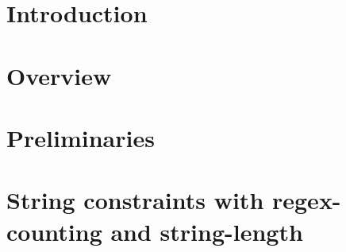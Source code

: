 \documentclass[preprint,12pt]{elsarticle}
\newcommand{\zhilin}[1]{\color{orange}\textbf{ZL:} #1 \textbf{:LZ}\color{black}}
\newcommand{\denghang}[1]{{\color{teal}\textbf{DH:} #1 \textbf{:HD}\color{black}}}
\begin{document}
\begin{frontmatter}





\end{frontmatter}


\section{Introduction} \label{sec:intro}


\section{Overview} \label{sec:overview}


\section{Preliminaries} \label{sec:pre}


\section{String constraints with regex-counting and string-length}\label{sec:recl}

\end{document}
